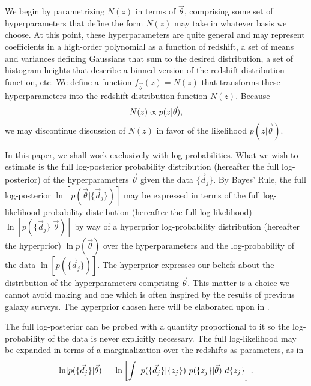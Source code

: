 We begin by parametrizing $N(z)$ in terms of $\vec{\theta}$, comprising some set of hyperparameters that define the form $N(z)$ may take in whatever basis we choose.  
At this point, these hyperparameters are quite general and may represent coefficients in a high-order polynomial as a function of redshift, a set of means and variances defining Gaussians that sum to the desired distribution, a set of histogram heights that describe a binned version of the redshift distribution function, etc.  
We define a function $f_{\vec{\theta}}(z)=N(z)$ that transforms these hyperparameters into the redshift distribution function $N(z)$.  
Because 
\begin{equation}
\eqlabel{eq:definition}
N(z)\propto p(z|\vec{\theta}),
\end{equation}
we may discontinue discussion of $N(z)$ in favor of the likelihood $p(z|\vec{\theta})$.

In this paper, we shall work exclusively with log-probabilities.  
What we wish to estimate is the full log-posterior probability distribution (hereafter the full log-posterior) of the hyperparameters $\vec{\theta}$ given the data $\{\vec{d}_{j}\}$.  
By Bayes' Rule, the full log-posterior $\ln[p(\vec{\theta}|\{\vec{d}_{j}\})]$ may be expressed in terms of the full log-likelihood probability distribution (hereafter the full log-likelihood) $\ln[p(\{\vec{d}_{j}\}|\vec{\theta})]$ by way of a hyperprior log-probability distribution (hereafter the hyperprior) $\ln p(\vec{\theta})$ over the hyperparameters and the log-probability of the data $\ln[p(\{\vec{d}_{j}\})]$.  
The hyperprior expresses our beliefs about the distribution of the hyperparameters comprising $\vec{\theta}$.  
This matter is a choice we cannot avoid making and one which is often inspired by the results of previous galaxy surveys.  
The hyperprior chosen here will be elaborated upon in .

The full log-posterior can be probed with a quantity proportional to it so the log-probability of the data is never explicitly necessary.  
The full log-likelihood may be expanded in terms of a marginalization over the redshifts as parameters, as in 
\begin{equation}
\eqlabel{eq:marginalize}
\ln[p(\{\vec{d}_{j}\}|\vec{\theta})] = \ln\left[\int\ p(\{\vec{d}_{j}\}|\{z_{j}\})\ p(\{z_{j}\}|\vec{\theta})\ d\{z_{j}\}\right].
\end{equation}

